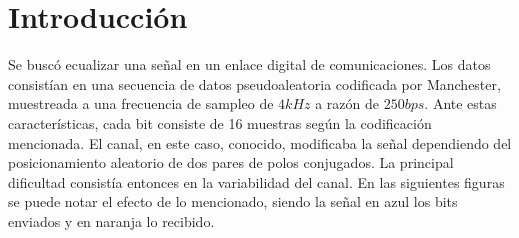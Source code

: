 \documentclass[main.tex]{subfiles}
\begin{document}
\begin{abstract}
\end{abstract}


\section{Introducción}
Se buscó ecualizar una señal en un enlace digital de comunicaciones. 
Los datos consistían en una secuencia de datos pseudoaleatoria 
codificada por Manchester, muestreada a una frecuencia de sampleo
 de $4kHz$ a razón de $250bps$. Ante estas características, cada bit consiste de 
 16 muestras según la codificación mencionada. El canal, en este caso, conocido, 
 modificaba la señal dependiendo del posicionamiento
 aleatorio de dos pares de polos conjugados.
La principal dificultad consistía entonces en la variabilidad del canal. En las 
siguientes figuras se puede notar el efecto de lo mencionado, siendo la 
señal en azul los bits enviados y en naranja lo recibido. \newline
\end{document}
